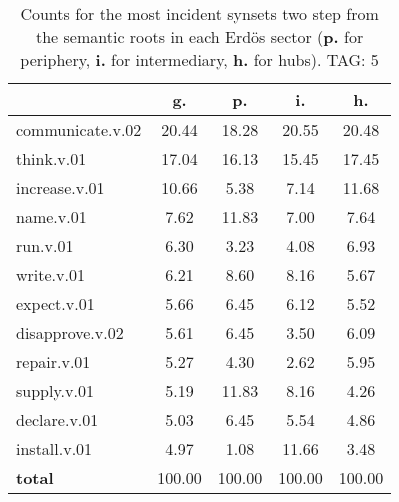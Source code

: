 \begin{table}[h!]
\begin{center}
\begin{tabular}{| l | c | c | c | c |}\hline
 & g. & p. & i. & h. \\\hline
communicate.v.02 & 20.44  & 18.28  & 20.55  & 20.48 \\\hline
think.v.01 & 17.04  & 16.13  & 15.45  & 17.45 \\\hline
increase.v.01 & 10.66  & 5.38  & 7.14  & 11.68 \\\hline
name.v.01 & 7.62  & 11.83  & 7.00  & 7.64 \\\hline
run.v.01 & 6.30  & 3.23  & 4.08  & 6.93 \\\hline
write.v.01 & 6.21  & 8.60  & 8.16  & 5.67 \\\hline
expect.v.01 & 5.66  & 6.45  & 6.12  & 5.52 \\\hline
disapprove.v.02 & 5.61  & 6.45  & 3.50  & 6.09 \\\hline
repair.v.01 & 5.27  & 4.30  & 2.62  & 5.95 \\\hline
supply.v.01 & 5.19  & 11.83  & 8.16  & 4.26 \\\hline
declare.v.01 & 5.03  & 6.45  & 5.54  & 4.86 \\\hline
install.v.01 & 4.97  & 1.08  & 11.66  & 3.48 \\\hline
{{\bf total}} & 100.00  & 100.00  & 100.00  & 100.00 \\\hline
\end{tabular}
\caption{Counts for the most incident synsets two step from the semantic roots in each Erd\"os sector ({\bf p.} for periphery, {\bf i.} for intermediary, {\bf h.} for hubs). TAG: 5}
\end{center}
\end{table}